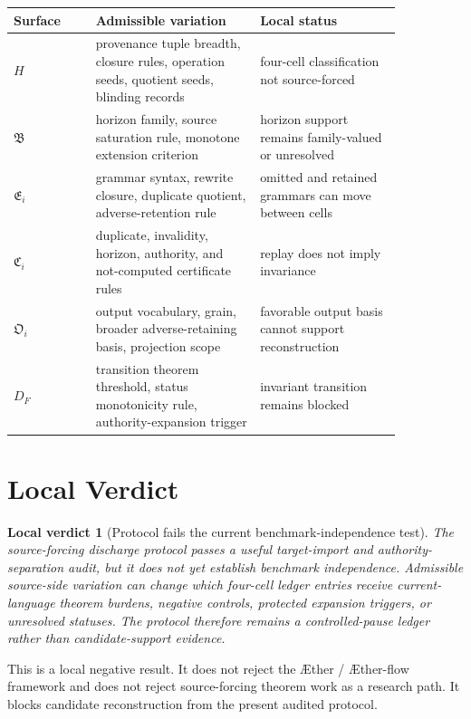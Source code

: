 \documentclass[11pt]{article}
\newcommand{\Aether}{\AE{}ther}
\newcommand{\Aflow}{\AE{}ther-flow}
\newcommand{\TheoryProgram}{\Aether{} / \Aflow{} framework}
\newcommand{\HorizonFam}{\mathfrak{B}}
\newcommand{\EnumFam}{\mathfrak{E}}
\newcommand{\CertFam}{\mathfrak{C}}
\newcommand{\OutFam}{\mathfrak{O}}
\newtheorem{verdict}{Local verdict}
\begin{document}
\begin{center}
\begin{tabular}{p{0.18\linewidth}p{0.36\linewidth}p{0.31\linewidth}}
\textbf{Surface} & \textbf{Admissible variation} & \textbf{Local status} \\
\hline
\(H\) & provenance tuple breadth, closure rules, operation seeds, quotient seeds, blinding records & four-cell classification not source-forced \\
\(\HorizonFam\) & horizon family, source saturation rule, monotone extension criterion & horizon support remains family-valued or unresolved \\
\(\EnumFam_i\) & grammar syntax, rewrite closure, duplicate quotient, adverse-retention rule & omitted and retained grammars can move between cells \\
\(\CertFam_i\) & duplicate, invalidity, horizon, authority, and not-computed certificate rules & replay does not imply invariance \\
\(\OutFam_i\) & output vocabulary, grain, broader adverse-retaining basis, projection scope & favorable output basis cannot support reconstruction \\
\(D_F\) & transition theorem threshold, status monotonicity rule, authority-expansion trigger & invariant transition remains blocked \\
\end{tabular}
\end{center}

\section{Local Verdict}

\begin{verdict}[Protocol fails the current benchmark-independence test]
The source-forcing discharge protocol passes a useful target-import and
authority-separation audit, but it does not yet establish benchmark
independence. Admissible source-side variation can change which four-cell
ledger entries receive current-language theorem burdens, negative controls,
protected expansion triggers, or unresolved statuses. The protocol therefore
remains a controlled-pause ledger rather than candidate-support evidence.
\end{verdict}

This is a local negative result. It does not reject the \TheoryProgram{} and
does not reject source-forcing theorem work as a research path. It blocks
candidate reconstruction from the present audited protocol.
\end{document}
